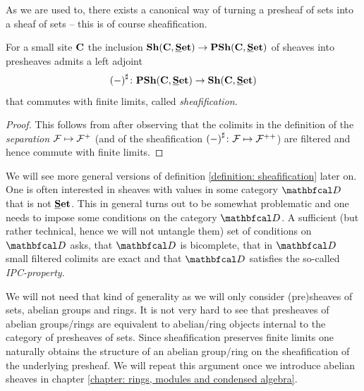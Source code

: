 As we are used to, there exists a canonical way of turning a presheaf of sets into a sheaf of sets -- this is of course sheafification.
\begin{definition}[Sheafification]
	\label{definition: sheafification}
	
	For a small site ${{\mathbf{C}}}$ the inclusion $\Sheaves{\site C}{\Set} \to \Presheaves{\site C}{\Set}$ of sheaves into presheaves admits a left adjoint
		$$\sheafification{-}\colon \Presheaves{\site C}{\Set} \to \Sheaves{\site C}{\Set}$$
	that commutes with finite limits, called \emph{sheafification}.
\end{definition}
\begin{proof}
	This follows from \cite[Prop. C2.2.6]{elephant2} after observing that the colimits in the definition of the \emph{separation} ${\mathcal{F}}\mapsto{\mathcal{F}}^+$ (and of the sheafification $\sheafification{-}\colon \sheaf{F}\mapsto \sheaf{F}^{++}$) are filtered and hence commute with finite limits.
\end{proof}

\begin{remark}
	We will see more general versions of definition \ref{definition: sheafification} later on. One is often interested in sheaves with values in some category $\category D$ that is not ${{\mathbf{\underline{S}et}}}$. This in general turns out to be somewhat problematic and one needs to impose some conditions on the category $\category D$. A sufficient (but rather technical, hence we will not untangle them) set of conditions on $\category D$ asks, that $\category D$ is bicomplete, that in $\category D$ small filtered colimits are exact and that $\category D$ satisfies the so-called \emph{IPC-property}.
	
	We will not need that kind of generality as we will only consider (pre)sheaves of sets, abelian groups and rings. It is not very hard to see that presheaves of abelian groups/rings are equivalent to abelian/ring objects internal to the category of presheaves of sets. Since sheafification preserves finite limits one naturally obtains the structure of an abelian group/ring on the sheafification of the underlying presheaf. We will repeat this argument once we introduce abelian sheaves in chapter \ref{chapter: rings, modules and condensed algebra}.
\end{remark}

